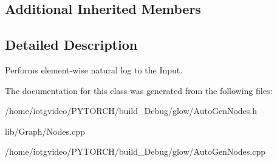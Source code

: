 \subsection*{Additional Inherited Members}


\subsection{Detailed Description}
Performs element-\/wise natural log to the Input. 

The documentation for this class was generated from the following files\+:\begin{DoxyCompactItemize}
\item 
/home/iotgvideo/\+P\+Y\+T\+O\+R\+C\+H/build\+\_\+\+Debug/glow/Auto\+Gen\+Nodes.\+h\item 
lib/\+Graph/Nodes.\+cpp\item 
/home/iotgvideo/\+P\+Y\+T\+O\+R\+C\+H/build\+\_\+\+Debug/glow/Auto\+Gen\+Nodes.\+cpp\end{DoxyCompactItemize}

